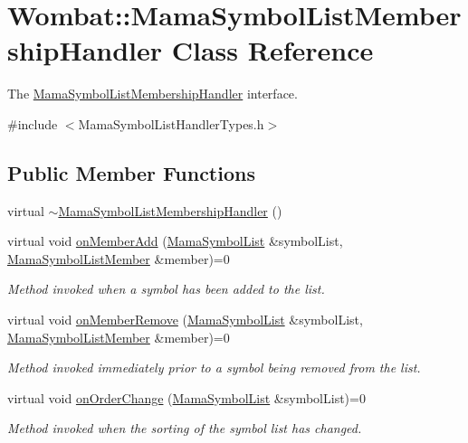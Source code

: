 \hypertarget{classWombat_1_1MamaSymbolListMembershipHandler}{
\section{Wombat::MamaSymbolListMembershipHandler Class Reference}
\label{classWombat_1_1MamaSymbolListMembershipHandler}
}


The \hyperlink{classWombat_1_1MamaSymbolListMembershipHandler}{MamaSymbolListMembershipHandler} interface.  


{\ttfamily \#include $<$MamaSymbolListHandlerTypes.h$>$}\subsection*{Public Member Functions}
\begin{DoxyCompactItemize}
\item 
virtual \hyperlink{classWombat_1_1MamaSymbolListMembershipHandler_aba263b5f66a1c8fbc4fcf1d49f76ffed}{$\sim$MamaSymbolListMembershipHandler} ()
\item 
virtual void \hyperlink{classWombat_1_1MamaSymbolListMembershipHandler_a6477fc850b111a96245aa45bc12d8c4c}{onMemberAdd} (\hyperlink{classWombat_1_1MamaSymbolList}{MamaSymbolList} \&symbolList, \hyperlink{classWombat_1_1MamaSymbolListMember}{MamaSymbolListMember} \&member)=0
\begin{DoxyCompactList}\small\item\em Method invoked when a symbol has been added to the list. \item\end{DoxyCompactList}\item 
virtual void \hyperlink{classWombat_1_1MamaSymbolListMembershipHandler_ade0d0346baa0d18f9bb1d90edf96f243}{onMemberRemove} (\hyperlink{classWombat_1_1MamaSymbolList}{MamaSymbolList} \&symbolList, \hyperlink{classWombat_1_1MamaSymbolListMember}{MamaSymbolListMember} \&member)=0
\begin{DoxyCompactList}\small\item\em Method invoked immediately prior to a symbol being removed from the list. \item\end{DoxyCompactList}\item 
virtual void \hyperlink{classWombat_1_1MamaSymbolListMembershipHandler_acfa51cc58e5a5aa428db3c124383e860}{onOrderChange} (\hyperlink{classWombat_1_1MamaSymbolList}{MamaSymbolList} \&symbolList)=0
\begin{DoxyCompactList}\small\item\em Method invoked when the sorting of the symbol list has changed. \item\end{DoxyCompactList}\end{DoxyCompactItemize}


